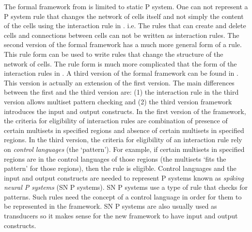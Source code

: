 \documentclass[12pt,A4]{article}
\begin{document}
The formal framework from \cite{freund-2007-ff-stat} is limited to static P system. One can not 
represent a P system rule that changes the network of cells itself and not simply the content of the
cells using the interaction rule in \cite{freund-2007-ff-stat}. i.e. The rules that can create and 
delete cells and connections between cells can not be written as interaction rules. The second
version of the formal framework \cite{freund-2013-ff-dyn} has a much more general form of a rule.
This rule form can be used to write rules that change the structure of the network of cells. The 
rule form is much more complicated that the form of the interaction rules in 
\cite{freund-2007-ff-stat}. A third version of the formal framework can be found in 
\cite{verlan-2020-ff-snp}. This version is actually an extension of the first version. The main
differences between the first and the third version are: (1) the interaction rule in the third
version allows multiset pattern checking and (2) the third version framework introduces the input
and output constructs. In the first version of the framework, the criteria for eligibility of
interaction rules are combination of presence of certain multisets in specified regions and absence
of certain multisets in specified regions. In the third version, the criteria for eligibility of an
interaction rule rely on \emph{control languages} (the `pattern'). For example, if certain multisets 
in specified regions are in the control languages of those regions (the multisets `fits the pattern'
for those regions), then the rule is eligible. Control languages and the input and output
constructs are needed to represent P systems known as \emph{spiking neural P systems} (SN P systems). 
SN P systems use a type of rule that checks for patterns. Such rules need the concept of a control 
language in order for them to be represented in the framework. SN P systems are also usually used as
transducers so it makes sense for the new framework to have input and output constructs.
\end{document}
